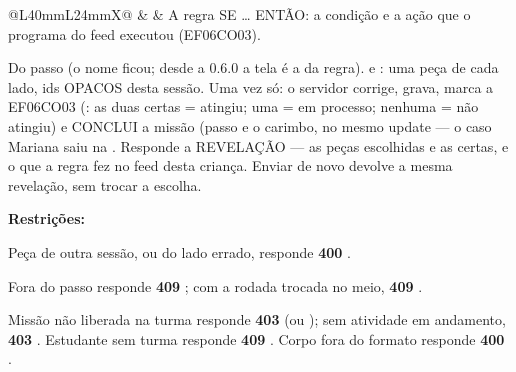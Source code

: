 \begin{tabularx}{\linewidth}{@{}L{40mm}L{24mm}X@{}}
 &  & A regra SE \ldots{} ENTÃO: a condição e a ação que o programa do feed executou (EF06CO03).\par Do passo  (o nome ficou; desde a 0.6.0 a tela é a da regra).  e : uma peça de cada lado, ids OPACOS  desta sessão. Uma vez só: o servidor corrige, grava, marca a EF06CO03 (: as duas certas = atingiu; uma = em processo; nenhuma = não atingiu) e CONCLUI a missão (passo  e o carimbo, no mesmo update --- o caso Mariana saiu na . Responde a REVELAÇÃO --- as peças escolhidas e as certas, e o que a regra fez no feed desta criança. Enviar de novo devolve a mesma revelação, sem trocar a escolha.\par \textbf{Restrições:}\par \hspace*{1em}\textbullet{} Peça de outra sessão, ou do lado errado, responde \textbf{400} .\par \hspace*{1em}\textbullet{} Fora do passo  responde \textbf{409} ; com a rodada trocada no meio, \textbf{409} .\par \hspace*{1em}\textbullet{} Missão não liberada na turma responde \textbf{403}  (ou ); sem atividade em andamento, \textbf{403} . Estudante sem turma responde \textbf{409} . Corpo fora do formato responde \textbf{400} .\\

\end{tabularx}
